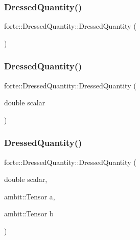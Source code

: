 \subsubsection{\texorpdfstring{Dressed\+Quantity()}{DressedQuantity()}\hspace{0.1cm}{\footnotesize\ttfamily [1/5]}}
{\footnotesize\ttfamily forte\+::\+Dressed\+Quantity\+::\+Dressed\+Quantity (\begin{DoxyParamCaption}{ }\end{DoxyParamCaption})}

\mbox{\label{classforte_1_1_dressed_quantity_a7f60134c01eeddca427024865f315d20}} 
\subsubsection{\texorpdfstring{Dressed\+Quantity()}{DressedQuantity()}\hspace{0.1cm}{\footnotesize\ttfamily [2/5]}}
{\footnotesize\ttfamily forte\+::\+Dressed\+Quantity\+::\+Dressed\+Quantity (\begin{DoxyParamCaption}\item[{double}]{scalar }\end{DoxyParamCaption})}

\mbox{\label{classforte_1_1_dressed_quantity_aa3daf37f0ebc740b33f824beb7a92914}} 
\subsubsection{\texorpdfstring{Dressed\+Quantity()}{DressedQuantity()}\hspace{0.1cm}{\footnotesize\ttfamily [3/5]}}
{\footnotesize\ttfamily forte\+::\+Dressed\+Quantity\+::\+Dressed\+Quantity (\begin{DoxyParamCaption}\item[{double}]{scalar,  }\item[{ambit\+::\+Tensor}]{a,  }\item[{ambit\+::\+Tensor}]{b }\end{DoxyParamCaption})}

